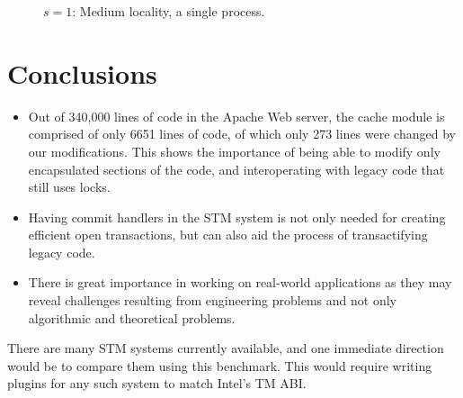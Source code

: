 \documentclass[preprint,11pt]{sigplanconf}
\begin{document}
\begin{figure}
 \centering
 \hfill
 \caption{$s = 1$: Medium locality, a single process.}
\end{figure}

\section{Conclusions}\label{sec:conclusions}
\begin{itemize}
  \item Out of 340,000 lines of code in the Apache Web server, the cache module
is comprised of only 6651 lines of code, of which only 273 lines were changed by
our modifications. This shows the importance of being able to modify only
encapsulated sections of the code, and interoperating with legacy code that
still uses locks.  
  \item Having commit handlers in the STM system is not only needed for creating
efficient open transactions, but can also aid the process of transactifying
legacy code.
  \item There is great importance in working on real-world applications as they
may reveal challenges resulting from engineering problems and not only
algorithmic and theoretical problems.
\end{itemize}
There are many STM systems currently available, and one immediate direction
would be to compare them using this benchmark. This would require writing
plugins for any such system to match Intel's TM ABI. 
\end{document}

